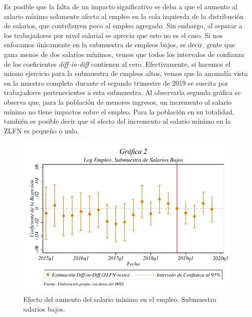 Es posible que la falta de un impacto significativo se deba a que el aumento al salario mínimo solamente afecta al empleo en la cola izquierda de la distribución de salarios, que contribuyen poco al empleo agregado. Sin embargo, al separar a los trabajadores por nivel salarial se aprecia que esto no es el caso. Si nos enfocamos únicamente en la submuestra de empleos bajos, es decir, gente que gana menos de dos salarios mínimos, vemos que todos los intervalos de confianza de los coeficientes \textit{diff-in-diff} contienen al cero. Efectivamente, si hacemos el mismo ejercicio para la submuestra de empleos altos, vemos que la anomalía vista en la muestra completa durante el segundo trimestre de 2019 se suscita por trabajadores pertenecientes a esta submuestra. Al observarla segunda gráfica se observa que, para la población de menores ingresos, un incremento al salario mínimo no tiene impactos sobre el empleo. Para la población en su totalidad, también es posible decir que el efecto del incremento al salario mínimo en la ZLFN es pequeño o nulo.

\begin{figure}[H]
\includegraphics[width=\textwidth]{Figures/LogEmpleo_SalariosBajos.pdf}
\caption{Efecto del aumento del salario mínimo en el empleo. Submuestra salarios bajos.}
\label{fig:2}
\end{figure}


